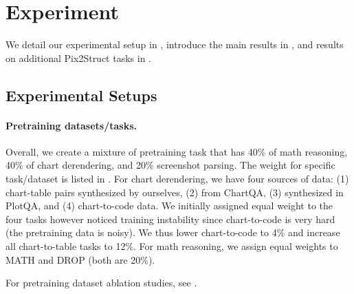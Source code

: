 
\section{Experiment}\label{sec:exp}
We detail our experimental setup in , introduce the main results in , and results on additional Pix2Struct tasks in .

\subsection{Experimental Setups}\label{sec:exp_setups}

\paragraph{Pretraining datasets/tasks.} Overall, we create a mixture of pretraining task that has 40\% of math reasoning, 40\% of chart derendering, and 20\% screenshot parsing. The weight for specific task/dataset is listed in . For chart derendering, we have four sources of data: (1) chart-table pairs synthesized by ourselves, (2) from ChartQA, (3) synthesized in PlotQA, and (4) chart-to-code data. We initially assigned equal weight to the four tasks however noticed training instability since chart-to-code is very hard (the pretraining data is noisy). We thus lower chart-to-code to 4\% and increase all chart-to-table tasks to 12\%. For math reasoning, we assign equal weights to MATH and DROP (both are 20\%).

For pretraining dataset ablation studies, see .

\begin{table}[t!]
    \small
    \centering
    \caption{Mixture rates for all tasks in pretraining and the absolute size of each dataset. The mixture rate is used to sample each example within the batch.}
    \label{tab:mixture_rate}
\end{table}

